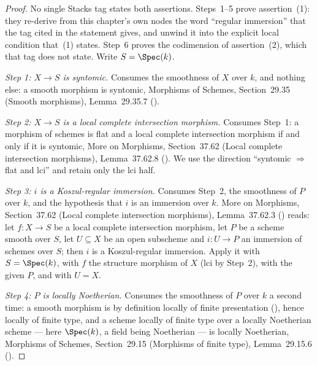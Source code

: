 \begin{proof}
No single Stacks tag states both assertions.  Steps~1--5 prove
assertion~(1): they re-derive from this chapter's own nodes the word
``regular immersion'' that the tag cited in the statement gives, and
unwind it into the explicit local condition that~(1) states.  Step~6
proves the codimension of assertion~(2), which that tag does not state.
Write $S=\Spec(k)$.

\emph{Step 1: $X\to S$ is syntomic.}  Consumes the smoothness of $X$ over
$k$, and nothing else: a smooth morphism is syntomic, Morphisms of
Schemes, Section~29.35 (Smooth morphisms), Lemma~29.35.7
().

\emph{Step 2: $X\to S$ is a local complete intersection morphism.}
Consumes Step~1: a morphism of schemes is flat and a local complete
intersection morphism if and only if it is syntomic, More on Morphisms,
Section~37.62 (Local complete intersection morphisms), Lemma~37.62.8
().  We use the direction ``syntomic
$\Rightarrow$ flat and lci'' and retain only the lci half.

\emph{Step 3: $i$ is a Koszul-regular immersion.}  Consumes Step~2, the
smoothness of $P$ over $k$, and the hypothesis that $i$ is an immersion
over $k$.  More on Morphisms, Section~37.62 (Local complete intersection
morphisms), Lemma~37.62.3 () reads:
let $f:X\to S$ be a local complete intersection morphism, let $P$ be a
scheme smooth over $S$, let $U\subseteq X$ be an open subscheme and
$i:U\to P$ an immersion of schemes over $S$; then $i$ is a Koszul-regular
immersion.  Apply it with $S=\Spec(k)$, with $f$ the structure morphism of
$X$ (lci by Step~2), with the given $P$, and with $U=X$.

\emph{Step 4: $P$ is locally Noetherian.}  Consumes the smoothness of $P$
over $k$ a second time: a smooth morphism is by definition locally of
finite presentation (), hence locally of
finite type, and a scheme locally of finite type over a locally Noetherian
scheme --- here $\Spec(k)$, a field being Noetherian --- is locally
Noetherian, Morphisms of Schemes, Section~29.15 (Morphisms of finite
type), Lemma~29.15.6 ().


\end{proof}
